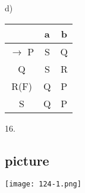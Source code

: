 \documentclass[9pt]{beamer}
\begin{document}
\begin{frame}
\begin{multicols}{4}
\begin{center}
\begin{tabular}{|c|c|c|}
\end{tabular}
\end{center}

d)
\begin{center}
\begin{tabular}{|c|c|c|}

\hline
  & a & b \\
\hline
$\rightarrow$ P & S & Q \\
\hline
Q & S & R \\
\hline
R(F) & Q & P \\
\hline
S & Q & P \\
\hline

\end{tabular}
\end{center}

\end{multicols}

16.
\begin{center}
\section{picture}
\texttt{[image: 124-1.png]}
\end{center}

\vspace*{0.2cm}
\end{frame}
\end{document}

